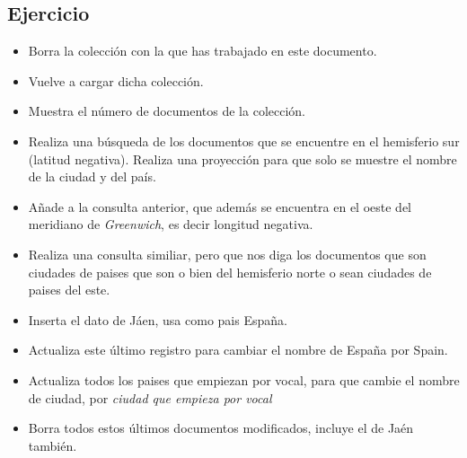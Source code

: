 \documentclass[4paper]{article}
\begin{document}
\subsection{Ejercicio}
\begin{itemize}
\item Borra la colección con la que has trabajado en este documento.
\item Vuelve a cargar dicha colección.
\item Muestra el número de documentos de la colección.
\item Realiza una búsqueda de los documentos que se encuentre en el hemisferio sur (latitud negativa). Realiza una proyección para que solo se muestre el nombre de la ciudad y del país.
\item Añade a la consulta anterior, que además se encuentra en el oeste del meridiano de \emph{Greenwich}, es decir longitud negativa.
\item Realiza una consulta similiar, pero que  nos diga los documentos que son ciudades de paises que son o bien del hemisferio norte o sean ciudades de paises del este.
\item Inserta el dato de Jáen, usa como pais España.
\item Actualiza este último registro para cambiar el nombre de España por Spain.
\item Actualiza todos los paises que empiezan por vocal, para que cambie el nombre de ciudad, por \emph{ciudad que empieza por vocal}
\item Borra todos estos últimos documentos modificados, incluye el de Jaén también.
\end{itemize}
\end{document}
